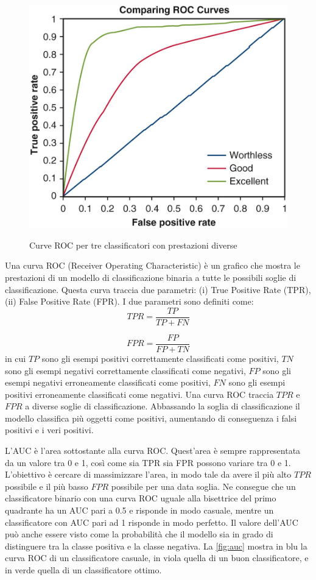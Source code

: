 \documentclass[12pt,italian]{report}
\begin{document}
\begin{figure}
  \centering
  \includegraphics[scale=0.50]{immagini/AUC.jpg}
  \caption{Curve ROC per tre classificatori con prestazioni diverse}
  \cite{auc-picture}
  \label{fig:auc}
\end{figure}

Una curva ROC (Receiver Operating Characteristic) è un grafico che mostra le prestazioni di un modello di classificazione binaria a tutte le possibili soglie di classificazione. Questa curva traccia due parametri: (i) True Positive Rate (TPR), (ii) False Positive Rate (FPR). I due parametri sono definiti come:
$$
TPR = \frac{TP}{TP+FN}
$$

$$
FPR = \frac{FP}{FP+TN}
$$
in cui $TP$ sono gli esempi positivi correttamente classificati come positivi, $TN$ sono gli esempi negativi correttamente classificati come negativi, $FP$ sono gli esempi negativi erroneamente classificati come positivi, $FN$ sono gli esempi positivi erroneamente classificati come negativi. Una curva ROC traccia $TPR$ e $FPR$ a diverse soglie di classificazione. Abbassando la soglia di classificazione il modello classifica più oggetti come positivi, aumentando di conseguenza i falsi positivi e i veri positivi. 

L'AUC è l'area sottostante alla curva ROC. Quest'area è sempre rappresentata da un valore tra 0 e 1, così come sia TPR sia FPR possono variare tra 0 e 1. L'obiettivo è cercare di massimizzare l'area, in modo tale da avere il più alto $TPR$ possibile e il più basso $FPR$ possibile per una data soglia. Ne consegue che un classificatore binario con una curva ROC uguale alla bisettrice del primo quadrante ha un AUC pari a 0.5 e risponde in modo casuale,  mentre un classificatore con AUC pari ad 1 risponde in modo perfetto. Il valore dell'AUC può anche essere visto come la probabilità che il modello sia in grado di distinguere tra la classe positiva e la classe negativa. La \autoref{fig:auc} mostra in blu la curva ROC di un classificatore casuale, in viola quella di un buon classificatore, e in verde quella di un classificatore ottimo. 
\end{document}
